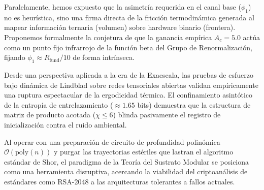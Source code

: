 \documentclass[12pt,a4paper]{article}
\theoremstyle{plain}
\theoremstyle{definition}
\theoremstyle{remark}
\begin{document}
Paralelamente, hemos expuesto que la asimetría requerida en el canal base ($\phi_1$) no es heurística, sino una firma directa de la fricción termodinámica generada al mapear información ternaria (volumen) sobre hardware binario (frontera). Proponemos formalmente la conjetura de que la ganancia empírica $A_c=5.0$ actúa como un punto fijo infrarrojo de la función beta del Grupo de Renormalización, fijando $\phi_1 \approx R_{\text{fund}}/10$ de forma intrínseca.

Desde una perspectiva aplicada a la era de la Exaescala, las pruebas de esfuerzo bajo dinámica de Lindblad sobre redes tensoriales abiertas validan empíricamente una ruptura espectacular de la ergodicidad térmica. El confinamiento asintótico de la entropía de entrelazamiento ($\approx 1.65$ bits) demuestra que la estructura de matriz de producto acotada ($\chi \le 6$) blinda pasivamente el registro de inicialización contra el ruido ambiental.

Al operar con una preparación de circuito de profundidad polinómica $\mathcal{O}(\text{poly}(n))$ y purgar las trayectorias estériles que lastran el algoritmo estándar de Shor, el paradigma de la Teoría del Sustrato Modular se posiciona como una herramienta disruptiva, acercando la viabilidad del criptoanálisis de estándares como RSA-2048 a las arquitecturas tolerantes a fallos actuales.
\end{document}
